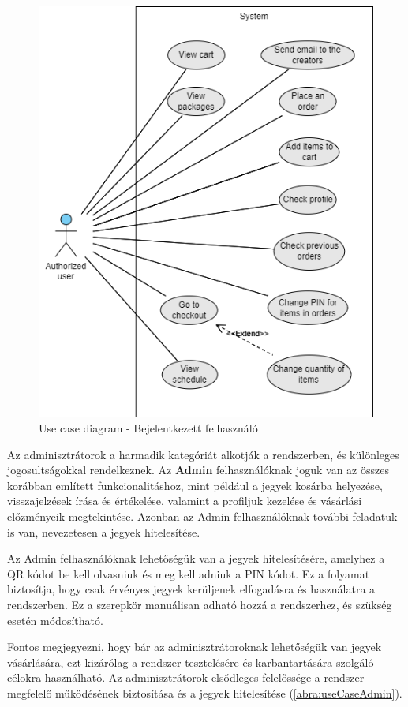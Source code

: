 \begin{itemize}
\begin{figure}[!h]
	\centering
	\includegraphics[scale=0.7]{images/useCaseA}
	\caption{Use case diagram - Bejelentkezett felhasználó}
	\label{abra:useCaseA}
\end{figure}
\pagebreak

Az adminisztrátorok a harmadik kategóriát alkotják a rendszerben, és különleges jogosultságokkal rendelkeznek. Az \textbf{Admin} felhasználóknak joguk van az összes korábban említett funkcionalitáshoz, mint például a jegyek kosárba helyezése, visszajelzések írása és értékelése, valamint a profiljuk kezelése és vásárlási előzményeik megtekintése. Azonban az Admin felhasználóknak további feladatuk is van, nevezetesen a jegyek hitelesítése.

Az Admin felhasználóknak lehetőségük van a jegyek hitelesítésére, amelyhez a QR kódot be kell olvasniuk és meg kell adniuk a PIN kódot. Ez a folyamat biztosítja, hogy csak érvényes jegyek kerüljenek elfogadásra és használatra a rendszerben. Ez a szerepkör manuálisan adható hozzá a rendszerhez, és szükség esetén módosítható.

Fontos megjegyezni, hogy bár az adminisztrátoroknak lehetőségük van jegyek vásárlására, ezt kizárólag a rendszer tesztelésére és karbantartására szolgáló célokra használható. Az adminisztrátorok elsődleges felelőssége a rendszer megfelelő működésének biztosítása és a jegyek hitelesítése (\ref{abra:useCaseAdmin}).


\end{itemize}
